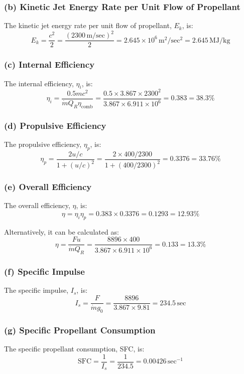 \documentclass{article}
\begin{document}
\subsubsection{(b) Kinetic Jet Energy Rate per Unit Flow of Propellant}
The kinetic jet energy rate per unit flow of propellant, $E_k$, is:
\[
E_k = \frac{c^2}{2} = \frac{(2300 \, \text{m/sec})^2}{2} = 2.645 \times 10^6 \, \text{m}^2/\text{sec}^2 = 2.645 \, \text{MJ/kg}
\]

\subsubsection{(c) Internal Efficiency}
The internal efficiency, $\eta_i$, is:
\[
\eta_i = \frac{0.5mc^2}{\dot{m} Q_R \eta_{\text{comb}}} = \frac{0.5 \times 3.867 \times 2300^2}{3.867 \times 6.911 \times 10^6} = 0.383 = 38.3\%
\]

\subsubsection{(d) Propulsive Efficiency}
The propulsive efficiency, $\eta_p$, is:
\[
\eta_p = \frac{2u/c}{1 + (u/c)^2} = \frac{2 \times 400/2300}{1 + (400/2300)^2} = 0.3376 = 33.76\%
\]

\subsubsection{(e) Overall Efficiency}
The overall efficiency, $\eta$, is:
\[
\eta = \eta_i \eta_p = 0.383 \times 0.3376 = 0.1293 = 12.93\%
\]

Alternatively, it can be calculated as:
\[
\eta = \frac{Fu}{\dot{m} Q_R} = \frac{8896 \times 400}{3.867 \times 6.911 \times 10^6} = 0.133 = 13.3\%
\]

\subsubsection{(f) Specific Impulse}
The specific impulse, $I_s$, is:
\[
I_s = \frac{F}{\dot{m} g_0} = \frac{8896}{3.867 \times 9.81} = 234.5 \, \text{sec}
\]

\subsubsection{(g) Specific Propellant Consumption}
The specific propellant consumption, SFC, is:
\[
\text{SFC} = \frac{1}{I_s} = \frac{1}{234.5} = 0.00426 \, \text{sec}^{-1}
\]
\end{document}
